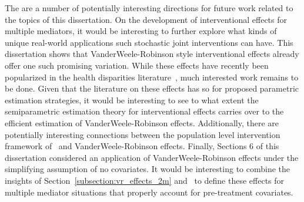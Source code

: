 The are a number of potentially interesting directions for future work related 
to the topics of this dissertation. On the development of interventional effects for 
multiple mediators, it would be interesting to further explore what kinds of unique 
real-world applications such stochastic joint interventions can have. This 
dissertation shows that VanderWeele-Robinson style interventional effects already 
offer one such promising variation. While these effects have recently been popularized 
in the health disparities literature~\cite{jackson2021}, much interested work 
remains to be done. Given that the literature on these effects has so for 
proposed parametric estimation strategies, it would be interesting to see to what 
extent the semiparametric estimation theory for interventional effects carries 
over to the efficient estimation of VanderWeele-Robinson effects. Additionally, there
are potentially interesting connections between the population level intervention 
framework of~\cite{hubbardvanderlaan2008} and VanderWeele-Robinson effects. Finally, 
Sections 6 of this dissertation considered an application of VanderWeele-Robinson 
effects under the simplifying assumption of no covariates. It would be interesting to 
combine the insights of Section~\ref{subsection:vr_effects_2m} 
and~\cite{jacksonvanderweele2018} to define these effects for multiple mediator situations
that properly account for pre-treatment covariates. 
